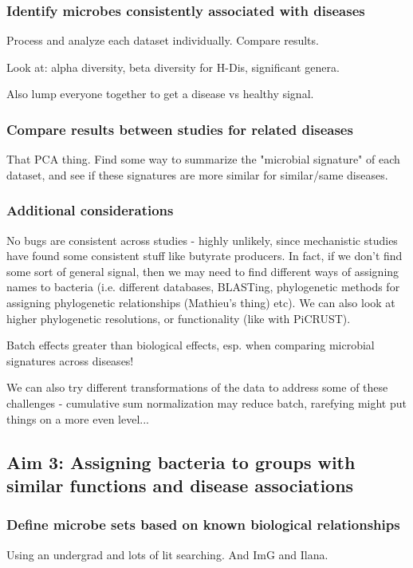 \documentclass[12pt]{article}
\begin{document}
\subsubsection{Identify microbes consistently associated with diseases}
Process and analyze each dataset individually. Compare results.

Look at: alpha diversity, beta diversity for H-Dis, significant genera.

Also lump everyone together to get a disease vs healthy signal.

\subsubsection{Compare results between studies for related diseases}


That PCA thing. Find some way to summarize the "microbial signature" of each dataset, and see if these signatures are more similar for similar/same diseases.

\subsubsection{Additional considerations}
No bugs are consistent across studies - highly unlikely, since mechanistic studies have found some consistent stuff like butyrate producers. In fact, if we don't find some sort of general signal, then we may need to find different ways of assigning names to bacteria (i.e. different databases, BLASTing, phylogenetic methods for assigning phylogenetic relationships (Mathieu's thing) etc). We can also look at higher phylogenetic resolutions, or functionality (like with PiCRUST).



Batch effects greater than biological effects, esp. when comparing microbial signatures across diseases!

We can also try different transformations of the data to address some of these challenges - cumulative sum normalization may reduce batch, rarefying might put things on a more even level...

\subsection{Aim 3: Assigning bacteria to groups with similar functions and disease associations}

\subsubsection{Define microbe sets based on known biological relationships}
Using an undergrad and lots of lit searching. And ImG and Ilana.
\end{document}
